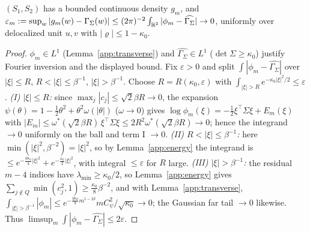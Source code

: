 \begin{proposition}\label{app:lclt}
$(S_1,S_2)$ has a bounded continuous density $g_m$, and
$\varepsilon_m:=\sup_w|g_m(w)-\Gamma_\Sigma(w)|\le(2\pi)^{-2}\int_{\mathbb{R}^2}|\phi_m-\widehat{\Gamma_\Sigma}|\to0$,
uniformly over delocalized unit $u,v$ with $|\varrho|\le1-\kappa_0$.
\end{proposition}
\begin{proof}
$\phi_m\in L^1$ (Lemma~\ref{app:transverse}) and $\widehat{\Gamma_\Sigma}\in L^1$
($\det\Sigma\ge\kappa_0$) justify Fourier inversion and the displayed bound.  Fix $\varepsilon>0$
and split $\int|\phi_m-\widehat{\Gamma_\Sigma}|$ over $|\xi|\le R$, $R<|\xi|\le\beta^{-1}$,
$|\xi|>\beta^{-1}$.  Choose $R=R(\kappa_0,\varepsilon)$ with
$\int_{|\xi|>R}e^{-\kappa_0|\xi|^2/2}\le\varepsilon$.
\emph{(I) $|\xi|\le R$:} since $\max_j|c_j|\le\sqrt2\beta R\to0$, the expansion
$\psi(\theta)=1-\tfrac12\theta^2+\theta^2\omega(|\theta|)$ ($\omega\to0$) gives
$\log\phi_m(\xi)=-\tfrac12\xi^\top\Sigma\xi+E_m(\xi)$ with $|E_m|\le\omega^*(\sqrt2\beta R)\,
\xi^\top\Sigma\xi\le2R^2\omega^*(\sqrt2\beta R)\to0$; hence the integrand $\to0$ uniformly on the
ball and term I $\to0$.  \emph{(II) $R<|\xi|\le\beta^{-1}$:} here $\min(|\xi|^2,\beta^{-2})=|\xi|^2$,
so by Lemma~\ref{app:energy} the integrand is $\le e^{-\frac{\eta\kappa_0}4|\xi|^2}+
e^{-\frac{\kappa_0}2|\xi|^2}$, with integral $\le\varepsilon$ for $R$ large.  \emph{(III)
$|\xi|>\beta^{-1}$:} the residual $m-4$ indices have $\lambda_{\min}\ge\kappa_0/2$, so
Lemma~\ref{app:energy} gives $\sum_{j\notin Q}\min(c_j^2,1)\ge\tfrac{\kappa_0}8\beta^{-2}$, and with
Lemma~\ref{app:transverse},
$\int_{|\xi|>\beta^{-1}}|\phi_m|\le e^{-\frac{\eta\kappa_0}8 m^{1-2\delta}} m C_\psi^2/\sqrt{\kappa_0}\to0$;
the Gaussian far tail $\to0$ likewise.  Thus $\limsup_m\int|\phi_m-\widehat{\Gamma_\Sigma}|\le2\varepsilon$.
\end{proof}

